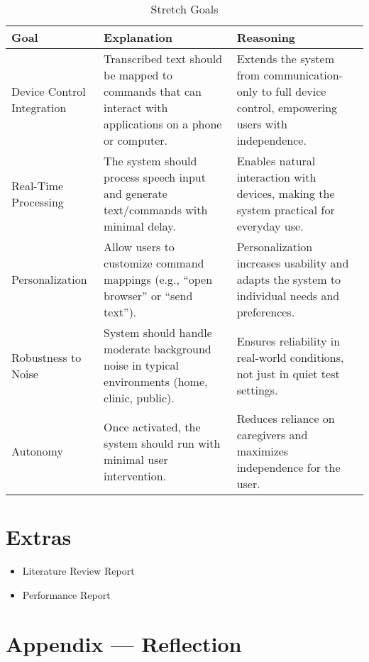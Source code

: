 \documentclass{article}
\begin{document}
\begin{table}[hp]
\caption{Stretch Goals}
\begin{tabularx}{\textwidth}{lXX} \\[-8pt]
\toprule
\textbf{Goal} & \textbf{Explanation} & \textbf{Reasoning}\\
\midrule
Device Control Integration & Transcribed text should be mapped to commands that can interact with applications on a phone or computer. & Extends the system from communication-only to full device control, empowering users with independence.\\
Real-Time Processing & The system should process speech input and generate text/commands with minimal delay. & Enables natural interaction with devices, making the system practical for everyday use.\\
Personalization & Allow users to customize command mappings (e.g., ``open browser'' or ``send text''). & Personalization increases usability and adapts the system to individual needs and preferences.\\
Robustness to Noise & System should handle moderate background noise in typical environments (home, clinic, public). & Ensures reliability in real-world conditions, not just in quiet test settings.\\
Autonomy & Once activated, the system should run with minimal user intervention. & Reduces reliance on caregivers and maximizes independence for the user.\\
\bottomrule
\end{tabularx}
\end{table}

\newpage

\section{Extras}

\begin{itemize}
    \item Literature Review Report
    \item Performance Report
\end{itemize}

\newpage{}

\section*{Appendix --- Reflection}



\end{document}
